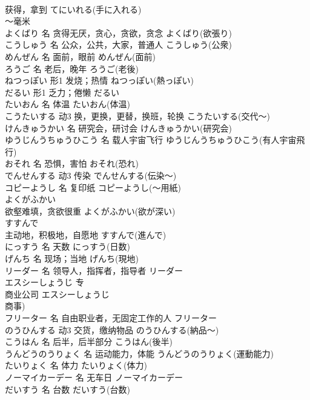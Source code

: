 \documentclass[8pt]{extreport}
\begin{document}
\begin{CJK}{UTF8}{min}
\\	获得，拿到	てにいれる(手に入れる)	
\\	～毫米	
\\	よくばり	名	贪得无厌，贪心，贪欲，贪念	よくばり(欲張り)	
\\	こうしゅう	名	公众，公共，大家，普通人	こうしゅう(公衆)	
\\	めんぜん	名	面前，眼前	めんぜん(面前)	
\\	ろうご	名	老后，晚年	ろうご(老後)	
\\	ねつっぽい	形1	发烧；热情	ねつっぽい(熱っぽい)	
\\	だるい	形1	乏力；倦懒	だるい	
\\	たいおん	名	体温	たいおん(体温)	
\\	こうたいする	动3	换，更换，更替，换班，轮换	こうたいする(交代～)	
\\	けんきゅうかい	名	研究会，研讨会	けんきゅうかい(研究会)	
\\	ゆうじんうちゅうひこう	名	载人宇宙飞行	ゆうじんうちゅうひこう(有人宇宙飛行)	
\\	おそれ	名	恐惧，害怕	おそれ(恐れ)	
\\	でんせんする	动3	传染	でんせんする(伝染～)	
\\	コピーようし	名	复印纸	コピーようし(～用紙)	
\\	よくがふかい	
\\	欲壑难填，贪欲很重	よくがふかい(欲が深い)	
\\	すすんで	
\\	主动地，积极地，自愿地	すすんで(進んで)	
\\	にっすう	名	天数	にっすう(日数)	
\\	げんち	名	现场；当地	げんち(現地)	
\\	リーダー	名	领导人，指挥者，指导者	リーダー	
\\	エスシーしょうじ	专	
\\	商业公司	エスシーしょうじ
\\	商事)	
\\	フリーター	名	自由职业者，无固定工作的人	フリーター	
\\	のうひんする	动3	交货，缴纳物品	のうひんする(納品～)	
\\	こうはん	名	后半，后半部分	こうはん(後半)	
\\	うんどうのうりょく	名	运动能力，体能	うんどうのうりょく(運動能力)	
\\	たいりょく	名	体力	たいりょく(体力)	
\\	ノーマイカーデー	名	无车日	ノーマイカーデー	
\\	だいすう	名	台数	だいすう(台数)	

\end{CJK}
\end{document}
